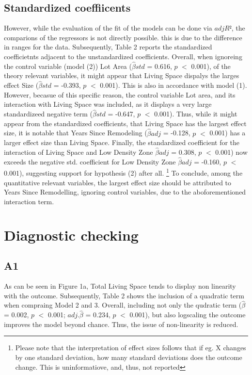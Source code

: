 \documentclass[a4paper]{article}
\begin{document}
\subsection{Standardized coeffiicents}
However, while the evaluation of the fit of the models can be done via $adjR²$, the comparions of the regressors is not directly possible. this is due to the difference in ranges for the data. Subsequently, Table 2 reports the standardized coefficietnts adjacent to the unstandardized coefficients. Overall, when ignoreing the control variable (model (2)) Lot Area ($\hat{\beta}std$ = 0.616, $p$ $<$ 0.001), of the theory relevant variables, it might appear that Living Space dispalys the larges effect Size ($\hat{\beta}std$ = -0.393, $p$ $<$ 0.001). This is also in accordance with model (1). However, becasue of this specific reason, the control variable Lot area, and its interaction with Living Space was included, as it displays a very large standardizeed negative term ($\hat{\beta}std$ = -0.647, $p$ $<$ 0.001). Thus, while it might appear from the standardized coefficients, that Living Space has the largest effect size, it is notable that Years Since Remodeling ($\hat{\beta}adj$ = -0.128, $p$ $<$ 0.001) has a larger effect size than Living Space. Finally, the standardized coefficient for the interaction of Living Space and Low Density Zone $\hat{\beta}adj$ = 0.308, $p$ $<$ 0.001) now exceeds the negative std. coefficient for Low Density Zone $\hat{\beta}adj$ = -0.160, $p$ $<$ 0.001), suggesting support for hypothesis (2) after all. \footnote{Please note that the interpretation of effect sizes follows that if eg. X changes by one standard deviation, how many standard deviations does the outcome change. This is uninformatiove, and, thus, not reported}
To conclude, among the quantitative relevant variables, the largest effect size should be attributed to Years Since Remodelling, ignoring control variables, due to the aboforementioned interaction term. 



\section{Diagnostic checking}
\subsection{A1}
As can be seen in Figure 1a, Total Living Space tends to display non linearity with the outcome. Subsequently, Table 2 shows the inclusion of a quadratic term when compraing Model 2 and 3. Overall, including not only the qudratic term ($\hat{\beta}$ = 0.002, $p$ $<$ 0.001; $adj.\hat{\beta}$ = 0.234, $p$ $<$	 0.001), but also logscaling the outcome improves the model beyond chance. Thus, the issue of non-linearity is reduced.
\end{document}
